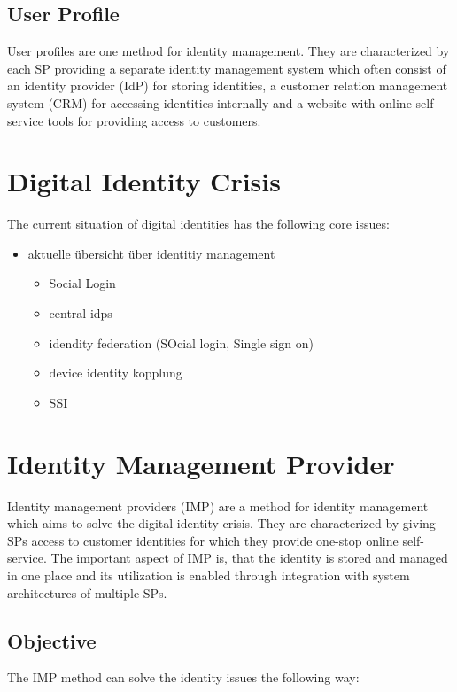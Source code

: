 \documentclass[
     12pt,         %
     a4paper,      %
     BCOR=10mm,version=first,     %
     DIV=14,version=first,        %
     ]{scrreprt}
\begin{document}
\subsection{User Profile}
User profiles are one method for identity management. They are characterized by each SP providing a separate identity management system which often consist of an identity provider (IdP) for storing identities, a customer relation management system (CRM) for accessing identities internally and a website with online self-service tools for providing access to customers.

\section{Digital Identity Crisis}
The current situation of digital identities has the following core issues:
\begin{itemize}
    \item aktuelle übersicht über identitiy management
    \begin{itemize}
        \begin{itemize}
            \item oAuth
            \item saml
        \end{itemize}
        \item Social Login
        \item central idps
        \item idendity federation (SOcial login, Single sign on)
        \item device identity kopplung
        \item SSI
    \end{itemize}
\end{itemize}

\section{Identity Management Provider}
Identity management providers (IMP) are a method for identity management which aims to solve the digital identity crisis. They are characterized by giving SPs access to customer identities for which they provide one-stop online self-service. The important aspect of IMP is, that the identity is stored and managed in one place and its utilization is enabled through integration with system architectures of multiple SPs.

\subsection{Objective}
The IMP method can solve the identity issues the following way:
\end{document}

